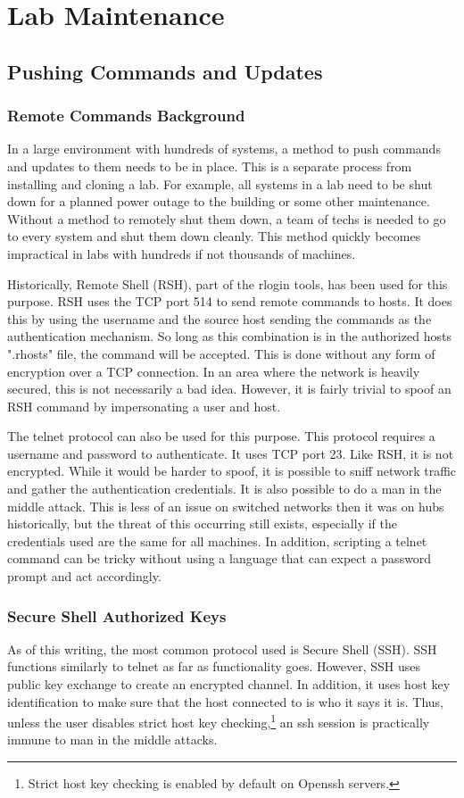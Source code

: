 \chapter{Lab Maintenance} \label{ch:lab_maintenance}
\section{Pushing Commands and Updates} \label{sec:ssh_push}
\subsection{Remote Commands Background}
In a large environment with hundreds of systems, a method to push commands and updates to them needs to be in place.  This is a separate process from installing and cloning a lab.  For example, all systems in a lab need to be shut down for a planned power outage to the building or some other maintenance.  Without a method to remotely shut them down, a team of techs is needed to go to every system and shut them down cleanly.  This method quickly becomes impractical in labs with hundreds if not thousands of machines.  

Historically, Remote Shell (RSH), part of the rlogin tools, has been used for this purpose.  RSH uses the TCP port 514 to send remote commands to hosts.  It does this by using the username and the source host sending the commands as the authentication mechanism.  So long as this combination is in the authorized hosts ".rhosts" file, the command will be accepted.  This is done without any form of encryption over a TCP connection.  In an area where the network is heavily secured, this is not necessarily a bad idea.  However, it is fairly trivial to spoof an RSH command by impersonating a user and host.  

The telnet protocol can also be used for this purpose.  This protocol requires a username and password to authenticate.  It uses TCP port 23.  Like RSH, it is not encrypted.  While it would be harder to spoof, it is possible to sniff network traffic and gather the authentication credentials.  It is also possible to do a man in the middle attack.  This is less of an issue on switched networks then it was on hubs historically, but the threat of this occurring still exists, especially if the credentials used are the same for all machines.  In addition, scripting a telnet command can be tricky without using a language that can expect a password prompt and act accordingly.
\subsection{Secure Shell Authorized Keys}
As of this writing, the most common protocol used is Secure Shell (SSH).  SSH functions similarly to telnet as far as functionality goes.  However, SSH uses public key exchange to create an encrypted channel.  In addition, it uses host key identification to make sure that the host connected to is who it says it is.  Thus, unless the user disables strict host key checking,\footnote{Strict host key checking is enabled by default on Openssh servers.} an ssh session is practically immune to man in the middle attacks.   

